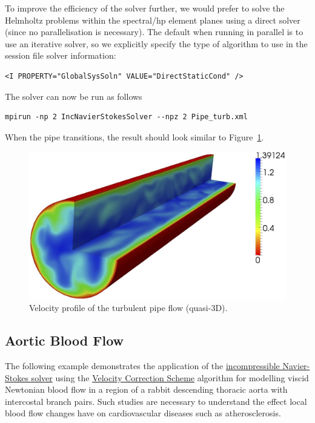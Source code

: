 To improve the efficiency of the solver further, we would prefer to solve
the Helmholtz problems within the spectral/hp element planes using a
direct solver (since no parallelisation is necessary). The default when
running in parallel is to use an iterative solver, so we explicitly
specify the type of algorithm to use in the session file solver
information:
\begin{lstlisting}[style=XMLStyle]
<I PROPERTY="GlobalSysSoln" VALUE="DirectStaticCond" />
\end{lstlisting}

The solver can now be run as follows
\begin{lstlisting}[style=BashInputStyle]
mpirun -np 2 IncNavierStokesSolver --npz 2 Pipe_turb.xml
\end{lstlisting}

When the pipe transitions, the result should look similar to
Figure~\ref{f:incns:turbpipeflow}.

\begin{figure}
\begin{center}
\includegraphics[width=12cm]{img/PipeCont.png}
\caption{Velocity profile of the turbulent pipe flow (quasi-3D).}
\label{f:incns:turbpipeflow}
\end{center}
\end{figure}



\subsection{Aortic Blood Flow}
The following example demonstrates the application of the
\hyperref[IncNSsolver]{incompressible Navier-Stokes solver} using the
\hyperref[VCSscheme]{Velocity Correction Scheme} algorithm for modelling viscid
Newtonian blood flow in a region of a rabbit descending thoracic aorta with
intercostal branch pairs. Such studies are necessary to understand the effect
local blood flow changes have on cardiovascular diseases such as
atherosclerosis.

